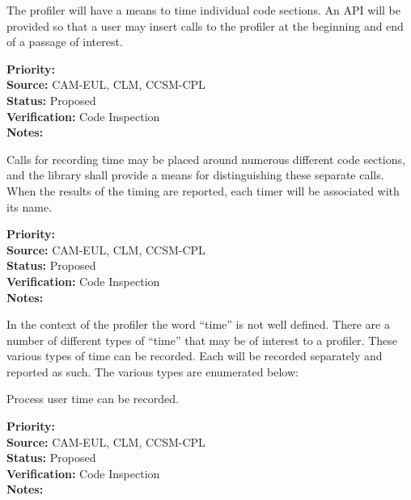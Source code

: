 

The profiler will have a means to time individual code sections.  An API will be 
provided so that a user may insert calls to the profiler at the beginning and
end of a passage of interest.

\begin{reqlist}
{\bf Priority:} \\
{\bf Source:} CAM-EUL, CLM, CCSM-CPL \\
{\bf Status:} Proposed \\
{\bf Verification:} Code Inspection \\
{\bf Notes:} 
\end{reqlist}


Calls for recording time may be placed around numerous different code sections, 
and the library shall provide a means for distinguishing these separate calls.  When
the results of the timing are reported, each timer will be associated with its name.

\begin{reqlist}
{\bf Priority:} \\
{\bf Source:} CAM-EUL, CLM, CCSM-CPL \\
{\bf Status:} Proposed \\
{\bf Verification:} Code Inspection \\
{\bf Notes:} 
\end{reqlist}


In the context of the profiler the word ``time'' is not well defined.  There are
a number of different types of ``time'' that may be of interest to a profiler.
These various types of time can be recorded.  Each will be recorded separately and reported
as such.  The various types are enumerated below:


Process user time can be recorded.

\begin{reqlist}
{\bf Priority:}  \\
{\bf Source:} CAM-EUL, CLM, CCSM-CPL \\
{\bf Status:} Proposed \\
{\bf Verification:} Code Inspection \\
{\bf Notes:} 
\end{reqlist}


